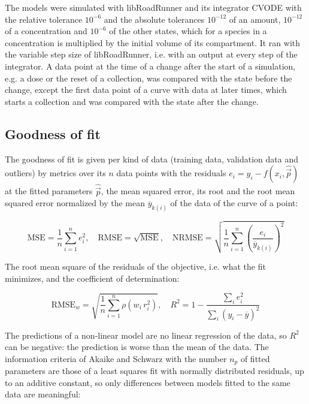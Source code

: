 \documentclass{article}
\begin{document}
The models were simulated with libRoadRunner \cite{Welsh2023} and its integrator CVODE \cite{Hindmarsh2005} with the relative tolerance $10^{-6}$ and the absolute tolerances $10^{-12}$ of an amount, $10^{-12}$ of a concentration and $10^{-6}$ of the other states, which for a species in a concentration is multiplied by the initial volume of its compartment. It ran with the variable step size of libRoadRunner, i.e. with an output at every step of the integrator. A data point at the time of a change after the start of a simulation, e.g. a dose or the reset of a collection, was compared with the state before the change, except the first data point of a curve with data at later times, which starts a collection and was compared with the state after the change.

\subsection{Goodness of fit}

The goodness of fit is given per kind of data (training data, validation data and outliers) by metrics over its $n$ data points with the residuals $e_i = y_i - f(x_i, \hat{\vec{p}})$ at the fitted parameters $\hat{\vec{p}}$, the mean squared error, its root and the root mean squared error normalized by the mean $\overline{y}_{k(i)}$ of the data of the curve of a point:

\begin{equation}
\mathrm{MSE} = \frac{1}{n} \sum_{i=1}^{n} e_i^2, \quad \mathrm{RMSE} = \sqrt{\mathrm{MSE}}, \quad \mathrm{NRMSE} = \sqrt{\frac{1}{n} \sum_{i=1}^{n} \left(\frac{e_i}{\overline{y}_{k(i)}}\right)^2}
\end{equation}

The root mean square of the residuals of the objective, i.e. what the fit minimizes, and the coefficient of determination:

\begin{equation}
\mathrm{RMSE}_w = \sqrt{\frac{1}{n} \sum_{i=1}^{n} \rho\left(w_i\, r_i^2\right)}, \quad R^2 = 1 - \frac{\sum_{i} e_i^2}{\sum_{i} \left(y_i - \overline{y}\right)^2}
\end{equation}

The predictions of a non-linear model are no linear regression of the data, so $R^2$ can be negative: the prediction is worse than the mean of the data. The information criteria of Akaike \cite{Akaike1974} and Schwarz \cite{Schwarz1978} with the number $n_p$ of fitted parameters are those of a least squares fit with normally distributed residuals, up to an additive constant, so only differences between models fitted to the same data are meaningful:
\end{document}
